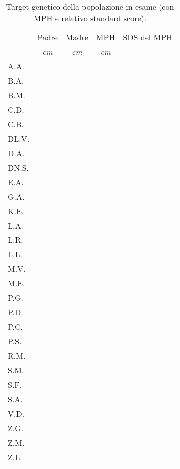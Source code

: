 \begin{table}[!h]
\begin{center}
\addtolength{\tabcolsep}{12pt}
\renewcommand{\arraystretch}{1.1}
\begin{tabular}{lcccc}
\toprule

 & Padre & Madre & MPH & SDS del MPH \\
 & \emph{cm} & \emph{cm} & \emph{cm} & \\
\midrule
A.A.	&  &  &  &  \\
B.A.	&  &  &  &  \\
B.M.	&  &  &  &  \\
C.D.	&  &  &  &  \\
C.B.	&  &  &  &  \\
DL.V.	&  &  &  &  \\
D.A.	&  &  &  &  \\
DN.S.	&  &  &  &  \\
E.A.	&  &  &  &  \\
G.A.	&  &  &  &  \\
K.E.	&  &  &  &  \\
L.A.	&  &  &  &  \\
L.R.	&  &  &  &  \\
L.L.	&  &  &  &  \\
M.V.	&  &  &  &  \\
M.E.	&  &  &  &  \\
P.G.	&  &  &  &  \\
P.D.	&  &  &  &  \\
P.C.	&  &  &  &  \\
P.S.	&  &  &  &  \\
R.M.	&  &  &  &  \\
S.M.	&  &  &  &  \\
S.F.	&  &  &  &  \\
S.A.	&  &  &  &  \\
V.D.	&  &  &  &  \\
Z.G.	&  &  &  &  \\
Z.M.	&  &  &  &  \\
Z.L.	&  &  &  &  \\
\bottomrule
\end{tabular}
\end{center}
\caption{Target genetico della popolazione in esame (con MPH e relativo standard score).}
\label{tab:TargetGenetici}
\end{table}

